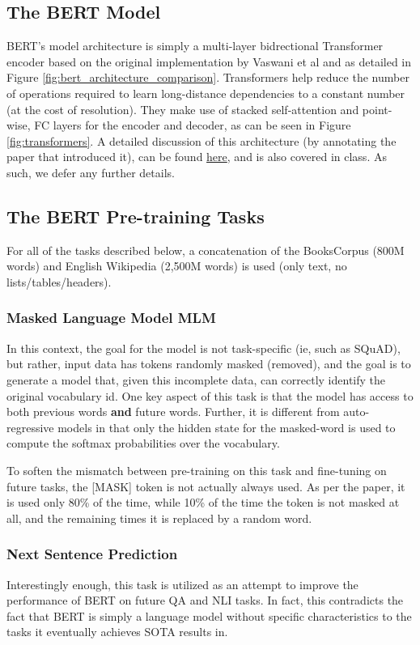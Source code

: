 \documentclass{article}
\begin{document}
\subsection{The BERT Model}
BERT's model architecture is simply a multi-layer bidrectional Transformer encoder based on the original implementation by Vaswani et al \cite{AttentionIsAllYouNeed} and as detailed in Figure \ref{fig:bert_architecture_comparison}. Transformers help reduce the number of operations required to learn long-distance dependencies to a constant number (at the cost of resolution). They make use of stacked self-attention and point-wise, FC layers for the encoder and decoder, as can be seen in Figure \ref{fig:transformers}. A detailed discussion of this architecture (by annotating the paper that introduced it), can be found \href{http://nlp.seas.harvard.edu/2018/04/03/attention.html}{here}, and is also covered in class. As such, we defer any further details.

\subsection{The BERT Pre-training Tasks}
For all of the tasks described below, a concatenation of the BooksCorpus (800M words) and English Wikipedia (2,500M words) is used (only text, no lists/tables/headers).

\subsubsection{Masked Language Model MLM}
In this context, the goal for the model is not task-specific (ie, such as SQuAD), but rather, input data has tokens randomly masked (removed), and the goal is to generate a model that, given this incomplete data, can correctly identify the original vocabulary id. One key aspect of this task is that the model has access to both previous words \textbf{and} future words. Further, it is different from auto-regressive models in that only the hidden state for the masked-word is used to compute the softmax probabilities over the vocabulary.

To soften the mismatch between pre-training on this task and fine-tuning on future tasks, the [MASK] token is not actually always used. As per the paper, it is used only 80\% of the time, while 10\% of the time the token is not masked at all, and the remaining times it is replaced by a random word.

\subsubsection{Next Sentence Prediction}
Interestingly enough, this task is utilized as an attempt to improve the performance of BERT on future QA and NLI tasks. In fact, this contradicts the fact that BERT is simply a language model without specific characteristics to the tasks it eventually achieves SOTA results in. 
\end{document}
